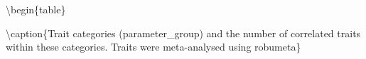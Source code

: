 \documentclass[]{article}
\newenvironment{Shaded}{\begin{snugshade}}{\end{snugshade}}
\newcommand{\CommentTok}[1]{\textcolor[rgb]{0.56,0.35,0.01}{\textit{#1}}}
\newcommand{\DataTypeTok}[1]{\textcolor[rgb]{0.13,0.29,0.53}{#1}}
\newcommand{\KeywordTok}[1]{\textcolor[rgb]{0.13,0.29,0.53}{\textbf{#1}}}
\newcommand{\NormalTok}[1]{#1}
\newcommand{\OperatorTok}[1]{\textcolor[rgb]{0.81,0.36,0.00}{\textbf{#1}}}
\newcommand{\StringTok}[1]{\textcolor[rgb]{0.31,0.60,0.02}{#1}}
\begin{document}
\begin{Shaded}
\end{Shaded}

\textbackslash{}begin\{table\}

\textbackslash{}caption\{\label{tab:TableS2}Trait categories
(parameter\_group) and the number of correlated traits within these
categories. Traits were meta-analysed using robumeta\} \centering
\end{document}
